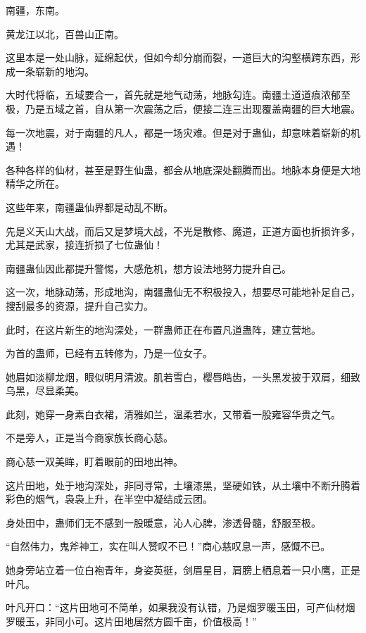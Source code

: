 
\begin{this_body}



南疆，东南。

黄龙江以北，百兽山正南。

这里本是一处山脉，延绵起伏，但如今却分崩而裂，一道巨大的沟壑横跨东西，形成一条崭新的地沟。

大时代将临，五域要合一，首先就是地气动荡，地脉勾连。南疆土道道痕浓郁至极，乃是五域之首，自从第一次震荡之后，便接二连三出现覆盖南疆的巨大地震。

每一次地震，对于南疆的凡人，都是一场灾难。但是对于蛊仙，却意味着崭新的机遇！

各种各样的仙材，甚至是野生仙蛊，都会从地底深处翻腾而出。地脉本身便是大地精华之所在。

这些年来，南疆蛊仙界都是动乱不断。

先是义天山大战，而后又是梦境大战，不光是散修、魔道，正道方面也折损许多，尤其是武家，接连折损了七位蛊仙！

南疆蛊仙因此都提升警惕，大感危机，想方设法地努力提升自己。

这一次，地脉动荡，形成地沟，南疆蛊仙无不积极投入，想要尽可能地补足自己，搜刮最多的资源，提升自己实力。

此时，在这片新生的地沟深处，一群蛊师正在布置凡道蛊阵，建立营地。

为首的蛊师，已经有五转修为，乃是一位女子。

她眉如淡柳龙烟，眼似明月清波。肌若雪白，樱唇皓齿，一头黑发披于双肩，细致乌黑，尽显柔美。

此刻，她穿一身素白衣裙，清雅如兰，温柔若水，又带着一股雍容华贵之气。

不是旁人，正是当今商家族长商心慈。

商心慈一双美眸，盯着眼前的田地出神。

这片田地，处于地沟深处，非同寻常，土壤漆黑，坚硬如铁，从土壤中不断升腾着彩色的烟气，袅袅上升，在半空中凝结成云团。

身处田中，蛊师们无不感到一股暖意，沁人心脾，渗透骨髓，舒服至极。

“自然伟力，鬼斧神工，实在叫人赞叹不已！”商心慈叹息一声，感慨不已。

她身旁站立着一位白袍青年，身姿英挺，剑眉星目，肩膀上栖息着一只小鹰，正是叶凡。

叶凡开口：“这片田地可不简单，如果我没有认错，乃是烟罗暖玉田，可产仙材烟罗暖玉，非同小可。这片田地居然方圆千亩，价值极高！”


\end{this_body}
